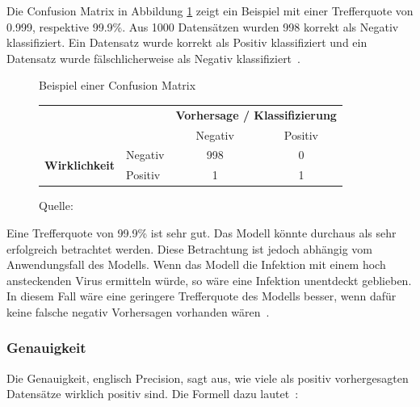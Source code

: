 Die Confusion Matrix in Abbildung \ref{cm-sample} zeigt ein Beispiel mit einer Trefferquote von 0.999, respektive 99.9\%. Aus 1000 Datensätzen wurden 998 korrekt als Negativ klassifiziert. Ein Datensatz wurde korrekt als Positiv klassifiziert und ein Datensatz wurde fälschlicherweise als Negativ klassifiziert~\autocite{TDSAccuracy}.

\begin{figure}[h!]
    \centering
    \captionsetup{width=.9\linewidth}
    \caption{Beispiel einer Confusion Matrix}
    \label{cm-sample}
    \def\arraystretch{1.5}
    \begin{tabular}{llcc}
        \multicolumn{2}{l}{}                                                                       & \multicolumn{2}{c}{\textbf{Vorhersage / Klassifizierung}}   \\ \cline{3-4} 
        \multicolumn{1}{c}{\textbf{}}                               & \multicolumn{1}{l|}{}        & \multicolumn{1}{c|}{Negativ} & \multicolumn{1}{c|}{Positiv} \\ \cline{2-4} 
        \multicolumn{1}{l|}{\multirow{2}{*}{\textbf{Wirklichkeit}}} & \multicolumn{1}{l|}{Negativ} & \multicolumn{1}{c|}{998}    & \multicolumn{1}{c|}{0}       \\ \cline{2-4} 
        \multicolumn{1}{l|}{}                                       & \multicolumn{1}{l|}{Positiv} & \multicolumn{1}{c|}{1}       & \multicolumn{1}{c|}{1}       \\ \cline{2-4} 
    \end{tabular}
    \vspace*{0.3cm}
    \caption*{Quelle: \textcite{TDSAccuracy}}
\end{figure}

Eine Trefferquote von 99.9\% ist sehr gut. Das Modell könnte durchaus als sehr erfolgreich betrachtet werden. Diese Betrachtung ist jedoch abhängig vom Anwendungsfall des Modells. Wenn das Modell die Infektion mit einem hoch ansteckenden Virus ermitteln würde, so wäre eine Infektion unentdeckt geblieben. In diesem Fall wäre eine geringere Trefferquote des Modells besser, wenn dafür keine falsche negativ Vorhersagen vorhanden wären~\autocite{TDSAccuracy}.

\subsubsection{Genauigkeit}

Die Genauigkeit, englisch Precision, sagt aus, wie viele als positiv vorhergesagten Datensätze wirklich positiv sind. Die Formell dazu lautet~\autocite{TDSAccuracy}: 

